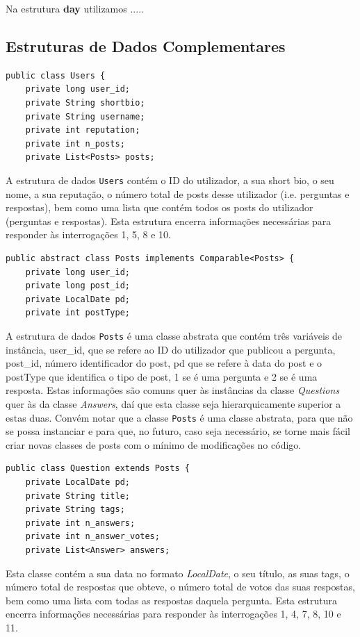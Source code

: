 \documentclass[a4paper]{article}
\begin{document}
Na estrutura \textbf{day} utilizamos .....


\subsection{Estruturas de Dados Complementares}
\label{sec:dados_complementares}

\begin{verbatim}
public class Users {
    private long user_id;
    private String shortbio;
    private String username;
    private int reputation;
    private int n_posts;
    private List<Posts> posts;
\end{verbatim}

A estrutura de dados \texttt{Users} contém o ID do utilizador, a sua short bio, o seu nome,
a sua reputação, o número total de posts desse utilizador (i.e. perguntas e respostas),
bem como uma lista que contém todos os posts do utilizador (perguntas e respostas).
Esta estrutura encerra informações necessárias para responder às interrogações 1,
5, 8 e 10.

\begin{verbatim}
public abstract class Posts implements Comparable<Posts> {
    private long user_id;
    private long post_id;
    private LocalDate pd;
    private int postType;
\end{verbatim}

A estrutura de dados \texttt{Posts} é uma classe abstrata que contém três variáveis
de instância, user\_id, que se refere ao ID do utilizador que publicou a pergunta,
post\_id, número identificador do post, pd que se refere à data do post e o
postType que identifica o tipo de post, 1 se é uma pergunta e 2 se é uma resposta.
Estas informações são comuns quer às instâncias da classe
\textit{Questions} quer às da classe \textit{Answers}, daí que esta classe seja
hierarquicamente superior a estas duas. Convém notar que a classe \texttt{Posts} é uma
classe abstrata, para que não se possa instanciar e para que, no futuro,
caso seja necessário, se torne mais fácil criar novas classes de posts com o
mínimo de modificações no código.


\begin{verbatim}
public class Question extends Posts {
    private LocalDate pd;
    private String title;
    private String tags;
    private int n_answers;
    private int n_answer_votes;
    private List<Answer> answers;
\end{verbatim}


Esta classe contém a sua data no formato \textit{LocalDate}, o seu título,
as suas tags, o número total de respostas que obteve, o número total de votos
das suas respostas, bem como uma lista com todas as respostas daquela pergunta.
Esta estrutura encerra informações necessárias para responder às interrogações 1,
4, 7, 8, 10 e 11.
\end{document}
